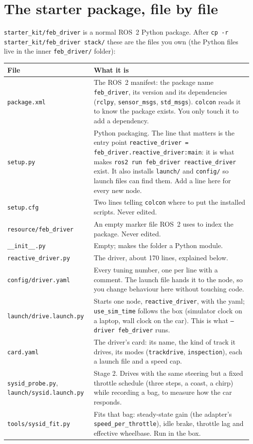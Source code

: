 
\section{The starter package, file by file}
\label{app:starter}

\texttt{starter\_kit/feb\_driver} is a normal ROS~2 Python package. After
\texttt{cp -r starter\_kit/feb\_driver stack/} these are the files you own (the Python files live in the inner \texttt{feb\_driver/} folder):

\begin{tabularx}{\linewidth}{p{4.4cm}X}
\toprule
File & What it is \\
\midrule
\texttt{package.xml} & The ROS~2 manifest: the package name \texttt{feb\_driver}, its version and
its dependencies (\texttt{rclpy}, \texttt{sensor\_msgs}, \texttt{std\_msgs}). \texttt{colcon}
reads it to know the package exists. You only touch it to add a dependency. \\
\texttt{setup.py} & Python packaging. The line that matters is the entry point
\texttt{reactive\_driver = feb\_driver.reactive\_driver:main}: it is what makes
\texttt{ros2 run feb\_driver reactive\_driver} exist. It also installs \texttt{launch/} and
\texttt{config/} so launch files can find them. Add a line here for every new node. \\
\texttt{setup.cfg} & Two lines telling \texttt{colcon} where to put the installed scripts. Never edited. \\
\texttt{resource/feb\_driver} & An empty marker file ROS~2 uses to index the package. Never edited. \\
\texttt{\_\_init\_\_.py} & Empty; makes the folder a Python module. \\
\texttt{reactive\_driver.py} & The driver, about 170 lines, explained below. \\
\texttt{config/driver.yaml} & Every tuning number, one per line with a comment. The launch file
hands it to the node, so you change behaviour here without touching code. \\
\texttt{launch/drive.launch.py} & Starts one node, \texttt{reactive\_driver}, with the yaml;
\texttt{use\_sim\_time} follows the box (simulator clock on a laptop, wall clock on the car). This
is what \texttt{--driver feb\_driver} runs. \\
\texttt{card.yaml} & The driver's card: its name, the kind of track it drives, its modes
(\texttt{trackdrive}, \texttt{inspection}), each a launch file and a speed cap. \\
\texttt{sysid\_probe.py}, \texttt{launch/sysid.launch.py} & Stage 2. Drives with the
same steering but a fixed throttle schedule (three steps, a coast, a chirp) while recording a
bag, to measure how the car responds. \\
\texttt{tools/sysid\_fit.py} & Fits that bag: steady-state gain (the adapter's
\texttt{speed\_per\_throttle}), idle brake, throttle lag and effective wheelbase. Run in the box. \\
\bottomrule
\end{tabularx}

